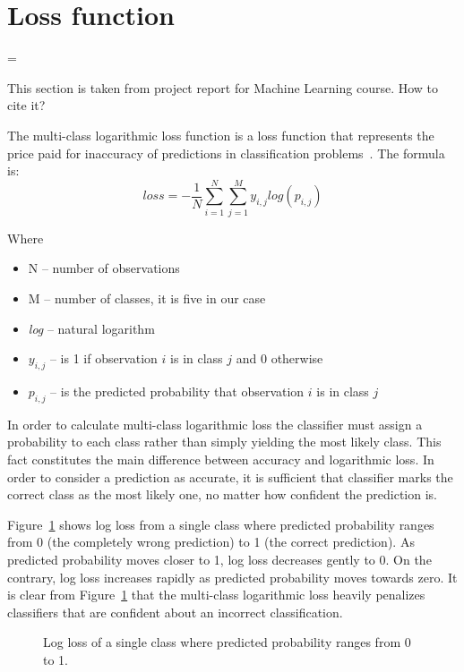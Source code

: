 \documentclass[a4paper, 11pt, table]{article}
\newenvironment{warning}
  {\par\begin{mdframed}[linewidth=2pt,linecolor=red]%
    \begin{list}{}{\leftmargin=1cm
                   \labelwidth=\leftmargin}\item[\Large\ding{43}]}
  {\end{list}\end{mdframed}\par}
\begin{document}
\section{Loss function}
\label{sec:loss_function}

\begin{warning}
This section is taken from project report for Machine Learning course. How to cite it?
\end{warning}

The multi-class logarithmic loss function is a loss function that represents the price paid for inaccuracy of predictions in classification problems~\cite{rosasco}. The formula is:
\begin{equation}
loss = -\frac{1}{N} \sum_{i=1}^{N} \sum_{j=1}^{M} y_{i,j} log(p_{i,j})
\end{equation}

Where 
\begin{itemize}
\item N -- number of observations
\item M -- number of classes, it is five in our case
\item \textit{log} -- natural logarithm
\item $y_{i,j}$ -- is 1 if observation $i$ is in class $j$ and 0 otherwise
\item $p_{i,j}$ --  is the predicted probability that observation $i$ is in class $j$
\end{itemize}

In order to calculate multi-class logarithmic loss the classifier must assign a probability to each class rather than simply yielding the most likely class. This fact constitutes the main difference between accuracy and logarithmic loss. In order to consider a prediction as accurate, it is sufficient that classifier marks the correct class as the most likely one, no matter how confident the prediction is.

Figure~\ref{fig:logloss} shows log loss from a single class where predicted probability ranges from 0 (the completely wrong prediction) to 1 (the correct prediction). As predicted probability moves closer to 1, log loss decreases gently to 0. On the contrary, log loss increases rapidly as predicted probability moves towards zero. It is clear from Figure~\ref{fig:logloss} that the multi-class logarithmic loss heavily penalizes classifiers that are confident about an incorrect classification.

\begin{figure}[H]
\centering
{}
\caption{\label{fig:logloss} Log loss of a single class where predicted probability ranges from 0 to 1. }
\end{figure}
\end{document}
